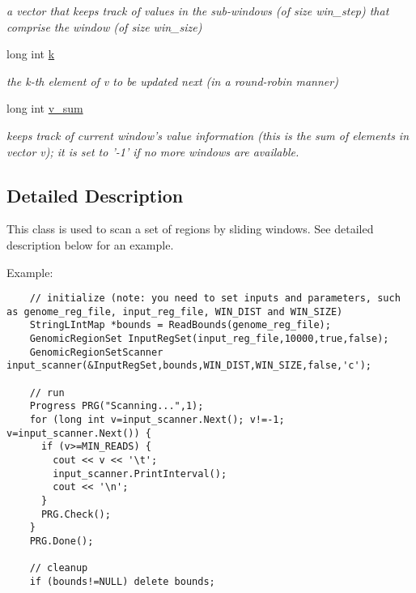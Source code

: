\begin{CompactItemize}
\begin{CompactList}\small\item\em a vector that keeps track of values in the sub-windows (of size win\_\-step) that comprise the window (of size win\_\-size) \item\end{CompactList}\item 
\hypertarget{classGenomicRegionSetScanner_fa341bbfce6cffdc2880c8f1c80abeb1}{
long int \hyperlink{classGenomicRegionSetScanner_fa341bbfce6cffdc2880c8f1c80abeb1}{k}}
\label{classGenomicRegionSetScanner_fa341bbfce6cffdc2880c8f1c80abeb1}

\begin{CompactList}\small\item\em the k-th element of v to be updated next (in a round-robin manner) \item\end{CompactList}\item 
\hypertarget{classGenomicRegionSetScanner_80be27fad3a3456e7aecd71fb7439c5a}{
long int \hyperlink{classGenomicRegionSetScanner_80be27fad3a3456e7aecd71fb7439c5a}{v\_\-sum}}
\label{classGenomicRegionSetScanner_80be27fad3a3456e7aecd71fb7439c5a}

\begin{CompactList}\small\item\em keeps track of current window's value information (this is the sum of elements in vector v); it is set to '-1' if no more windows are available. \item\end{CompactList}\end{CompactItemize}


\subsection{Detailed Description}
This class is used to scan a set of regions by sliding windows. See detailed description below for an example. 

Example: 

\begin{Code}\begin{verbatim}    // initialize (note: you need to set inputs and parameters, such as genome_reg_file, input_reg_file, WIN_DIST and WIN_SIZE)
    StringLIntMap *bounds = ReadBounds(genome_reg_file);
    GenomicRegionSet InputRegSet(input_reg_file,10000,true,false);
    GenomicRegionSetScanner input_scanner(&InputRegSet,bounds,WIN_DIST,WIN_SIZE,false,'c');

    // run
    Progress PRG("Scanning...",1);
    for (long int v=input_scanner.Next(); v!=-1; v=input_scanner.Next()) {
      if (v>=MIN_READS) {
        cout << v << '\t';
        input_scanner.PrintInterval();
        cout << '\n';
      }
      PRG.Check();
    }
    PRG.Done();
  
    // cleanup
    if (bounds!=NULL) delete bounds;
\end{verbatim}
\end{Code}

